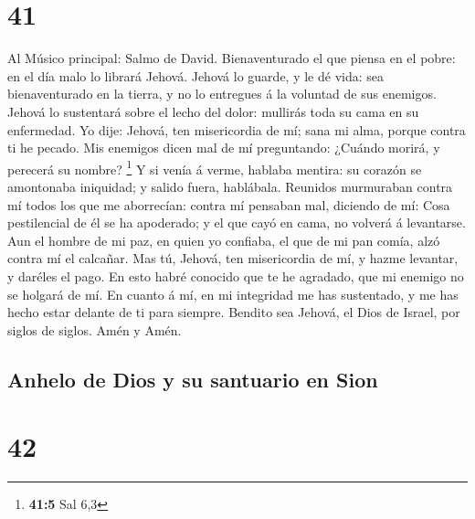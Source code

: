 \hypertarget{section-40}{%
\section{41}\label{section-40}}

 Al Músico principal: Salmo de David. Bienaventurado el que
piensa en el pobre: en el día malo lo librará Jehová. 
Jehová lo guarde, y le dé vida: sea bienaventurado en la tierra, y no lo
entregues á la voluntad de sus enemigos.  Jehová lo
sustentará sobre el lecho del dolor: mullirás toda su cama en su
enfermedad.  Yo dije: Jehová, ten misericordia de mí; sana
mi alma, porque contra ti he pecado.  Mis enemigos dicen mal
de mí preguntando: ¿Cuándo morirá, y perecerá su nombre? \footnote{\textbf{41:5}
  Sal 6,3}  Y si venía á verme, hablaba mentira: su corazón
se amontonaba iniquidad; y salido fuera, hablábala. 
Reunidos murmuraban contra mí todos los que me aborrecían: contra mí
pensaban mal, diciendo de mí:  Cosa pestilencial de él se ha
apoderado; y el que cayó en cama, no volverá á levantarse. 
Aun el hombre de mi paz, en quien yo confiaba, el que de mi pan comía,
alzó contra mí el calcañar.  Mas tú, Jehová, ten
misericordia de mí, y hazme levantar, y daréles el pago. 
En esto habré conocido que te he agradado, que mi enemigo no se holgará
de mí.  En cuanto á mí, en mi integridad me has sustentado,
y me has hecho estar delante de ti para siempre.  Bendito
sea Jehová, el Dios de Israel, por siglos de siglos. Amén y Amén.

\hypertarget{anhelo-de-dios-y-su-santuario-en-sion}{%
\subsection{Anhelo de Dios y su santuario en
Sion}\label{anhelo-de-dios-y-su-santuario-en-sion}}

\hypertarget{section-41}{%
\section{42}\label{section-41}}

